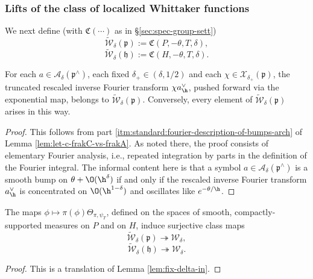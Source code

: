 \subsubsection{Lifts of the class of localized Whittaker functions}
We next define (with $\mathfrak{C}(\dotsb)$ as in \S\ref{sec:spec-group-sett}) 
\begin{equation*}
  \tilde{\mathcal{W}}_\delta(\mathfrak{p}) := \mathfrak{C}(P, - \theta, T, \delta),
\end{equation*}
\begin{equation*}
  \tilde{\mathcal{W}}_\delta(\mathfrak{h}) := \mathfrak{C}(H, - \theta, T, \delta).
\end{equation*}

\begin{lemma}\label{lem:W-delta-via-Fourier}
  For each $a \in \mathcal{A}_\delta(\mathfrak{p}^\wedge)$, each fixed $\delta_+ \in (\delta,1/2)$ and each $\chi \in \mathcal{X}_{\delta_+}(\mathfrak{p})$, the truncated rescaled inverse Fourier transform $\chi a_{\h}^\vee$, pushed forward via the exponential map, belongs to $\tilde{\mathcal{W}}_{\delta}(\mathfrak{p})$.  Conversely, every element of $\tilde{\mathcal{W}}_{\delta}(\mathfrak{p})$ arises in this way.
\end{lemma}
\begin{proof}
  This follows from part \eqref{itm:standard:fourier-description-of-bumps-arch} of Lemma \ref{lem:let-c-frakC-vs-frakA}.  As noted there, the proof consists of elementary Fourier analysis, i.e., repeated integration by parts in the definition of the Fourier integral.  The informal content here is that a symbol $a \in \mathcal{A}_\delta(\mathfrak{p}^\wedge)$ is a smooth bump on $\theta + \O(\h^\delta)$ if and only if the rescaled inverse Fourier transform $a_{\h}^\vee$ is concentrated on $\O(\h^{1-\delta})$ and oscillates like $e^{-\theta/\h}$.
\end{proof}

\begin{lemma}\label{lem:map-c_cinftyp-ni-tilde-W-delta-W}
  The maps $\phi \mapsto \pi(\phi) \Theta_{\pi,\psi_T}$, defined on the spaces of smooth, compactly-supported measures on $P$ and on $H$, induce surjective class maps
  \begin{equation*}
    \tilde{\mathcal{W}}_\delta(\mathfrak{p}) \twoheadrightarrow \mathcal{W}_\delta,
  \end{equation*}
  \begin{equation*}
    \tilde{\mathcal{W}}_\delta(\mathfrak{h}) \twoheadrightarrow \mathcal{W}_\delta.
  \end{equation*}
\end{lemma}
\begin{proof}
  This is a translation of Lemma \ref{lem:fix-delta-in}.
\end{proof}

